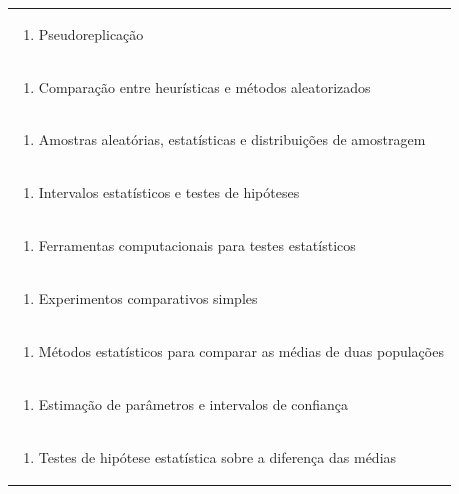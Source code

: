 \documentclass[11pt]{article}
\begin{document}
\begin{center}
\begin{longtable}{|p{4cm}|p{4cm}|p{4cm}|p{4cm}|}
\multicolumn{4}{|p{\dimexpr 16cm + 6\tabcolsep\relax}|}{\begin{enumerate}[start=10]\item Pseudoreplicação\end{enumerate}}\\
\multicolumn{4}{|p{\dimexpr 16cm + 6\tabcolsep\relax}|}{\begin{enumerate}[start=11]\item Comparação entre heurísticas e métodos aleatorizados\end{enumerate}}\\
\multicolumn{4}{|p{\dimexpr 16cm + 6\tabcolsep\relax}|}{\begin{enumerate}[start=12]\item Amostras aleatórias, estatísticas e distribuições de amostragem\end{enumerate}}\\
\multicolumn{4}{|p{\dimexpr 16cm + 6\tabcolsep\relax}|}{\begin{enumerate}[start=13]\item Intervalos estatísticos e testes de hipóteses\end{enumerate}}\\
\multicolumn{4}{|p{\dimexpr 16cm + 6\tabcolsep\relax}|}{\begin{enumerate}[start=14]\item Ferramentas computacionais para testes estatísticos\end{enumerate}}\\
\multicolumn{4}{|p{\dimexpr 16cm + 6\tabcolsep\relax}|}{\begin{enumerate}[start=15]\item Experimentos comparativos simples\end{enumerate}}\\
\multicolumn{4}{|p{\dimexpr 16cm + 6\tabcolsep\relax}|}{\begin{enumerate}[start=16]\item Métodos estatísticos para comparar as médias de duas populações\end{enumerate}}\\
\multicolumn{4}{|p{\dimexpr 16cm + 6\tabcolsep\relax}|}{\begin{enumerate}[start=17]\item Estimação de parâmetros e intervalos de confiança\end{enumerate}}\\
\multicolumn{4}{|p{\dimexpr 16cm + 6\tabcolsep\relax}|}{\begin{enumerate}[start=18]\item Testes de hipótese estatística sobre a diferença das médias\end{enumerate}}\\

\end{longtable}
\end{center}
\end{document}
